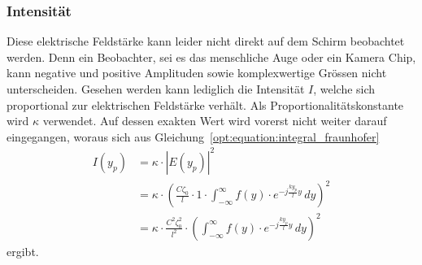 \subsubsection{Intensität}
Diese elektrische Feldstärke kann leider nicht direkt auf dem Schirm beobachtet werden.
Denn ein Beobachter, sei es das menschliche Auge oder ein Kamera Chip, kann negative und positive Amplituden sowie komplexwertige Grössen nicht unterscheiden.
Gesehen werden kann lediglich die Intensität $I$, welche sich proportional zur elektrischen Feldstärke verhält.
Als Proportionalitätskonstante wird $\kappa$ verwendet.
Auf dessen exakten Wert wird vorerst nicht weiter darauf eingegangen, woraus sich aus Gleichung~\ref{opt:equation:integral_fraunhofer}
\begin{align}
I(y_p)
&=
\kappa \cdot |E(y_p)|^2
\\
&=
\kappa \cdot \left(\frac{C\zeta_0}{l} \cdot 1 \cdot \int_{-\infty}^{\infty}f(y)\cdot e^{-j\frac{ky_p}{l}y} \,dy\right)^2
\\
&=
\kappa \cdot \frac{C^2\zeta_0^2}{l^2}\cdot \left(\int_{-\infty}^{\infty}f(y)\cdot e^{-j\frac{ky_p}{l}y} \,dy\right)^2
\label{opt:equation:integral_intensity}
\end{align}
ergibt.

